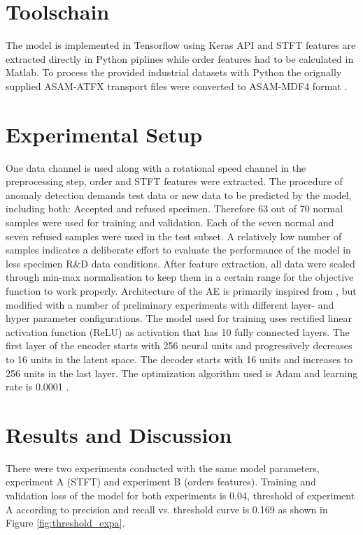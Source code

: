\documentclass[a4paper, 10pt, twocolumn]{article}
\begin{document}
\section*{Toolschain}
\label{sec:Toolschain}
 The model is implemented in Tensorflow using Keras API and STFT features are extracted directly in Python piplines while order features had to be calculated in Matlab. To process the provided industrial datasets with Python the orignally supplied ASAM-ATFX transport files were converted to ASAM-MDF4 format \cite{b6}.     
 
 \section*{Experimental Setup}
\label{sec:Experimental Setup}
One data channel is used along with a rotational speed channel in the preprocessing step, order and STFT features were extracted. The procedure of anomaly detection demands test data or new data to be predicted by the model, including both: Accepted and refused specimen. Therefore 63 out of 70 normal samples were used for training and validation. Each of the seven normal and seven refused samples were used in the test subset. A relatively low number of samples indicates a deliberate effort to evaluate the performance of the model in less specimen R\&D data conditions. After feature extraction, all data were scaled through min-max normalisation to keep them in a certain range for the objective function to work properly. Architecture of the AE is primarily inspired from \cite{b7}, but modified with a number of preliminary experiments with different layer- and hyper parameter configurations. The model used for training uses rectified linear activation function (ReLU) as activation that has 10 fully connected layers. The first layer of the encoder starts with 256 neural units and progressively decreases to 16 units in the latent space. The decoder starts with 16 units and increases to 256 units in the last layer. The optimization algorithm used is Adam and learning rate is 0.0001 \cite{b8}.

\section*{Results and Discussion}
\label{sec:Results and Discussion}
There were two experiments conducted with the same model parameters, experiment A (STFT) and experiment B (orders features). Training and validation loss of the model for both experiments is 0.04, threshold of experiment A according to precision and recall vs. threshold curve is 0.169 as shown in Figure \ref{fig:threshold_expa}.
\end{document}
